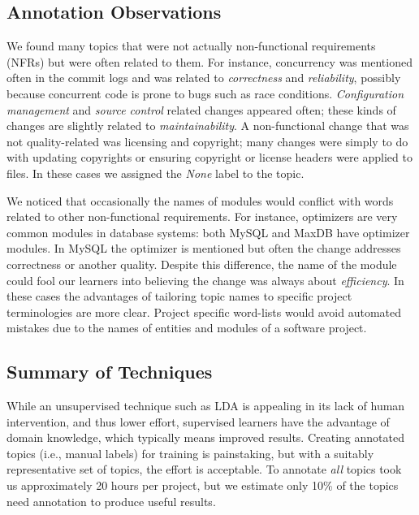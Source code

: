 \documentclass[smallextended]{svjour3}       %
\begin{document}
\subsection{Annotation Observations}
We found many topics that were not actually non-functional requirements (NFRs) but were often related to them. 
For instance, concurrency was mentioned often in the commit logs and
was related to \emph{correctness} and \emph{reliability}, possibly because concurrent code is prone to bugs such as race conditions. %
\emph{Configuration management} and \emph{source control} related changes appeared often; %
these kinds of changes are slightly related to \emph{maintainability}. 
A non-functional change that was not quality-related was licensing and
copyright; many changes were simply to do with updating copyrights or
ensuring copyright or license headers were applied to files. In these
cases we assigned the \emph{None} label to the topic.

We noticed that occasionally the names of modules would conflict with words related to other non-functional requirements. 
For instance, optimizers are very common modules in database systems: both MySQL and MaxDB have optimizer modules. 
In MySQL the optimizer is mentioned but often the change addresses  correctness or another quality. 
Despite this difference, the name of the module could fool our learners into believing the change was always about \emph{efficiency}. 
In these cases the advantages of tailoring topic names to specific project terminologies are more clear. 
Project specific word-lists would avoid automated mistakes due to the names of entities and modules of a software project.

\subsection{Summary of Techniques}
While an unsupervised technique such as LDA is appealing in its lack of human intervention, and thus lower effort, 
supervised learners have the advantage of domain knowledge, which typically means improved results. 
Creating annotated topics (i.e., manual labels) for training is painstaking, but with a suitably representative set of topics, the effort is acceptable. To annotate \emph{all} topics took us approximately 20 hours per project, but we estimate only 10\% of the topics need annotation to produce useful results.
\end{document}
